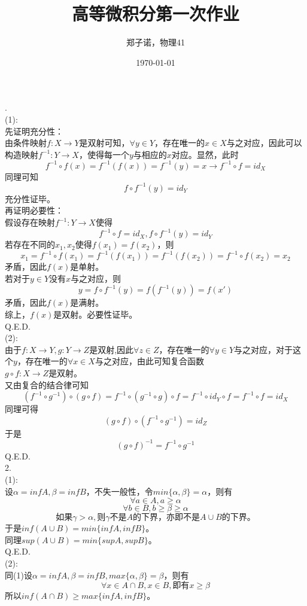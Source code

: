 \documentclass[utf8]{ctexart}
\title{高等微积分第一次作业}
\author{郑子诺，物理41}
\date{\today}
\begin{document}
\maketitle
{}.\\
(1):\\
先证明充分性：\\
由条件映射$f:X\to Y$是双射可知，$\forall y\in Y$，存在唯一的$x\in X$与之对应，因此可以构造映射$f^{-1}:Y\to X$，使得每一个$y$与相应的$x$对应。显然，此时
$$f^{-1}\circ f(x)=f^{-1}(f(x))=f^{-1}(y)=x\rightarrow f^{-1}\circ f=id_{X}$$
同理可知$$f\circ f^{-1}(y)=id_{Y}$$
充分性证毕。\\
再证明必要性：\\
假设存在映射$f^{-1}:Y\to X$使得
$$f^{-1}\circ f=id_{X},f\circ f^{-1}(y)=id_{Y}$$
若存在不同的$x_1,x_2$使得$f(x_1)=f(x_2)$，则
$$x_1=f^{-1}\circ f(x_1)=f^{-1}(f(x_1))=f^{-1}(f(x_2))=f^{-1}\circ f(x_2)=x_2$$
矛盾，因此$f(x)$是单射。\\
若对于$y\in Y$没有$x$与之对应，则
$$y=f\circ f^{-1}(y)=f(f^{-1}(y))=f(x')$$
矛盾，因此$f(x)$是满射。\\
综上，$f(x)$是双射。必要性证毕。\\
Q.E.D.\\
(2):\\
由于$f:X\to Y,g:Y\to Z$是双射,因此$\forall z\in Z$，存在唯一的$\forall y\in Y$与之对应，对于这个$y$，存在唯一的$\forall x\in X$与之对应，由此可知复合函数\\$g\circ f:X\to Z$是双射。\\
又由复合的结合律可知
$$(f^{-1}\circ g^{-1})\circ (g\circ f)=f^{-1}\circ (g^{-1}\circ g)\circ f=f^{-1}\circ id_{Y}\circ f=f^{-1}\circ f=id_{X}$$
同理可得$$(g\circ f)\circ (f^{-1}\circ g^{-1})=id_{Z}$$
于是$$(g\circ f)^{-1}=f^{-1}\circ g^{-1}$$
Q.E.D.\\
2.\\
(1):\\
设$\alpha=inf A,\beta=inf B$，不失一般性，令$min\{\alpha,\beta\}=\alpha$，则有
$$\forall a\in A,a\ge \alpha$$
$$\forall b\in B,b\ge \beta\ge \alpha$$
$$\text{如果}\gamma>\alpha,\text{则}\gamma \text{不是}A\text{的下界，亦即不是}A\cup B\text{的下界。}$$
于是$inf(A\cup B)=min\{inf A,inf B\}$。\\
同理$sup(A\cup B)=min\{sup A,sup B\}$。\\
Q.E.D.\\
(2):\\
同(1)设$\alpha=inf A,\beta=inf B,max\{\alpha,\beta\}=\beta$，则有
$$\forall x\in A\cap B,x\in B,\text{即有}x\ge\beta$$
所以$inf(A\cap B)\ge max\{inf A,inf B\}$。\\
\end{document}
